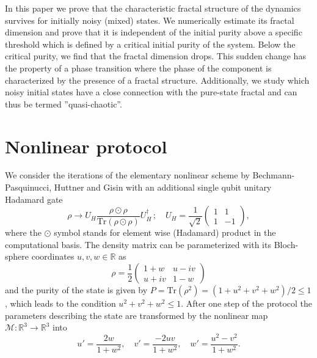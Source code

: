 \documentclass[%
 aip,
 amsmath,amssymb,
 reprint,%
]{revtex4-1}
\begin{document}
In this paper we prove that the characteristic fractal structure of the dynamics survives for initially noisy (mixed) states. We numerically estimate its fractal dimension and prove that it is independent of the initial purity above a specific threshold which is defined by a critical initial purity of the system. Below the critical purity, we find that the fractal dimension drops. This sudden change has the property of a phase transition \cite{Sole1996} where the phase of the component is characterized by the presence of a fractal structure.  Additionally, we study which noisy initial states have a close connection with the pure-state fractal and can thus be termed ''quasi-chaotic''.


\section{Nonlinear protocol}
We consider the iterations of the elementary nonlinear scheme by Bechmann-Pasquinucci, Huttner and Gisin \cite{Gisin} with an additional single qubit unitary Hadamard gate   
\begin{equation}\label{protocol}
\rho\rightarrow U_{H} \frac{\rho\odot\rho}{\text{Tr}(\rho\odot\rho)} U_{H}^{\dagger} \, ; \quad U_{H}=\frac{1}{\sqrt{2}} \begin{pmatrix} 1 & 1 \\ 1 & -1 \end{pmatrix},
\end{equation}
where the $\odot$ symbol stands for element wise (Hadamard) product in the computational basis.  The density matrix can be parameterized with its Bloch-sphere coordinates $u,v,w\in \mathbb{R}$ as
\begin{equation}
\label{1qstate}
\rho=\frac{1}{2}\begin{pmatrix}1+w & u-iv  \\ u+iv & 1-w \end{pmatrix} 
\end{equation}
and the purity of the state is given by $P=\text{Tr}(\rho^2)=(1+u^2+v^2+w^2)/2\leq 1$, which leads to the condition $u^2+v^2+w^2\leq 1$.
After one step of the protocol the parameters describing the state are transformed by the nonlinear map $\mathcal{M}:\mathbb{R}^{3}\to\mathbb{R}^{3}$ into
\begin{equation}\label{evolution}
u'=\frac{2w}{1+w^2}, \quad v'=\frac{-2uv}{1+w^2}, \quad w'=\frac{u^2-v^2}{1+w^2}.
\end{equation}
\end{document}
